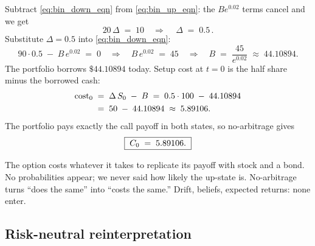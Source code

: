 Subtract \eqref{eq:bin_down_eqn} from \eqref{eq:bin_up_eqn}: the
$Be^{0.02}$ terms cancel and we get
\begin{equation}
  20\,\Delta \;=\; 10
  \quad\Longrightarrow\quad
  \boxed{\,\Delta \;=\; 0.5\,}.
  \label{eq:bin_delta}
\end{equation}
Substitute $\Delta = 0.5$ into \eqref{eq:bin_down_eqn}:
\begin{equation}
  90 \cdot 0.5 \;-\; B\,e^{0.02} \;=\; 0
  \quad\Longrightarrow\quad
  B\,e^{0.02} \;=\; 45
  \quad\Longrightarrow\quad
  B \;=\; \frac{45}{e^{0.02}} \;\approx\; 44.10894.
  \label{eq:bin_B}
\end{equation}
The portfolio borrows $\$44.10894$ today. Setup cost at $t = 0$
is the half share minus the borrowed cash:
\begin{align}
  \text{cost}_0
  \;&=\; \Delta\,S_0 \;-\; B
  \;=\; 0.5 \cdot 100 \;-\; 44.10894 \nonumber \\
  \;&=\; 50 \;-\; 44.10894
  \;\approx\; 5.89106. \label{eq:bin_cost}
\end{align}
The portfolio pays exactly the call payoff in both states, so
no-arbitrage gives
\begin{equation}
  \boxed{\;C_0 \;=\; 5.89106.\;}
  \label{eq:bin_C0}
\end{equation}

\begin{intuitionbox}
The option costs whatever it takes to replicate its payoff with
stock and a bond. No probabilities appear; we never said how
likely the up-state is. No-arbitrage turns ``does the same'' into
``costs the same.'' Drift, beliefs, expected returns: none
enter.
\end{intuitionbox}

\subsection{Risk-neutral reinterpretation}
\label{subsec:ch15_binomial_riskneutral}

